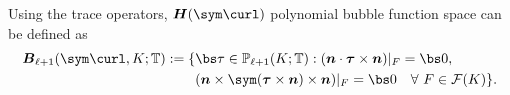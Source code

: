 %
Using the trace operators, $\boldsymbol H(\sym\curl)$ polynomial bubble function space can be defined as
\begin{align*}
\boldsymbol B_{\ell+1}(\sym\curl, K;\mathbb T):=\{&  
\bs\tau\in\mathbb P_{\ell+1}(K;\mathbb T):(\boldsymbol n\cdot \boldsymbol \tau\times\boldsymbol n)|_F=\bs0, \\
&(\boldsymbol n\times \sym(\boldsymbol\tau\times\boldsymbol n)\times\boldsymbol n)|_F=\bs0\quad\forall~F\in\mathcal F(K)
\}.
\end{align*}

